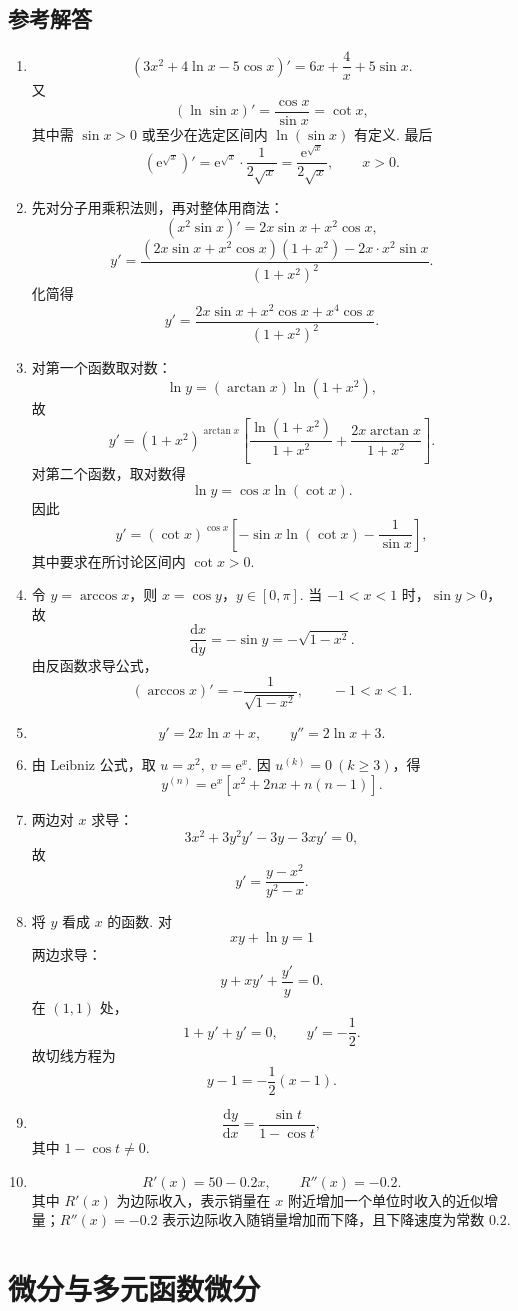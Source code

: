 \documentclass[fontset=fandol]{ctexart}
\newcounter{DefinitionCounter}[section]
\newcounter{TheoremCounter}[section]
\newcounter{PropositionCounter}[section]
\newcounter{ExampleCounter}[section]
\newcounter{ExerciseCounter}[section]
\newcommand{\renewEnvironmentCounter}{\setcounter{DefinitionCounter}{0}\setcounter{TheoremCounter}{0}\setcounter{PropositionCounter}{0}\setcounter{ExampleCounter}{0}\setcounter{ExerciseCounter}{0}}
\newcommand{\dd}{\mathrm{d}}
\newcommand{\ee}{\mathrm{e}}
\begin{document}
\subsection{参考解答}
\begin{enumerate}[label=\textbf{练习\arabic*.},leftmargin=2.2em]
\item
\[
(3x^2+4\ln x-5\cos x)'=6x+\frac4x+5\sin x.
\]
又
\[
(\ln\sin x)'=\frac{\cos x}{\sin x}=\cot x,
\]
其中需 $\sin x>0$ 或至少在选定区间内 $\ln(\sin x)$ 有定义. 最后
\[
(\ee^{\sqrt{x}})'=\ee^{\sqrt{x}}\cdot\frac1{2\sqrt{x}}
=\frac{\ee^{\sqrt{x}}}{2\sqrt{x}},\qquad x>0.
\]
\item 先对分子用乘积法则，再对整体用商法：
\[
\left(x^2\sin x\right)'=2x\sin x+x^2\cos x,
\]
\[
y'=\frac{(2x\sin x+x^2\cos x)(1+x^2)-2x\cdot x^2\sin x}{(1+x^2)^2}.
\]
化简得
\[
y'=\frac{2x\sin x+x^2\cos x+x^4\cos x}{(1+x^2)^2}.
\]
\item 对第一个函数取对数：
\[
\ln y=(\arctan x)\ln(1+x^2),
\]
故
\[
y'=(1+x^2)^{\arctan x}\left[\frac{\ln(1+x^2)}{1+x^2}+\frac{2x\arctan x}{1+x^2}\right].
\]
对第二个函数，取对数得
\[
\ln y=\cos x\ln(\cot x).
\]
因此
\[
y'=(\cot x)^{\cos x}\left[-\sin x\ln(\cot x)-\frac1{\sin x}\right],
\]
其中要求在所讨论区间内 $\cot x>0$.
\item 令 $y=\arccos x$，则 $x=\cos y$，$y\in[0,\pi]$. 当 $-1<x<1$ 时，$\sin y>0$，故
\[
\frac{\dd x}{\dd y}=-\sin y=-\sqrt{1-x^2}.
\]
由反函数求导公式，
\[
(\arccos x)'=-\frac1{\sqrt{1-x^2}},\qquad -1<x<1.
\]
\item
\[
y'=2x\ln x+x,\qquad y''=2\ln x+3.
\]
\item 由 Leibniz 公式，取 $u=x^2,\ v=\ee^x$. 因 $u^{(k)}=0\ (k\geq3)$，得
\[
y^{(n)}=\ee^x\left[x^2+2nx+n(n-1)\right].
\]
\item 两边对 $x$ 求导：
\[
3x^2+3y^2y'-3y-3xy'=0,
\]
故
\[
y'=\frac{y-x^2}{y^2-x}.
\]
\item 将 $y$ 看成 $x$ 的函数. 对
\[
xy+\ln y=1
\]
两边求导：
\[
y+xy'+\frac{y'}{y}=0.
\]
在 $(1,1)$ 处，
\[
1+y'+y'=0,\qquad y'=-\frac12.
\]
故切线方程为
\[
y-1=-\frac12(x-1).
\]
\item
\[
\frac{\dd y}{\dd x}=\frac{\sin t}{1-\cos t},
\]
其中 $1-\cos t\neq0$.
\item
\[
R'(x)=50-0.2x,\qquad R''(x)=-0.2.
\]
其中 $R'(x)$ 为边际收入，表示销量在 $x$ 附近增加一个单位时收入的近似增量；$R''(x)=-0.2$ 表示边际收入随销量增加而下降，且下降速度为常数 $0.2$.
\end{enumerate}

\section{微分与多元函数微分}
\renewEnvironmentCounter
\end{document}
